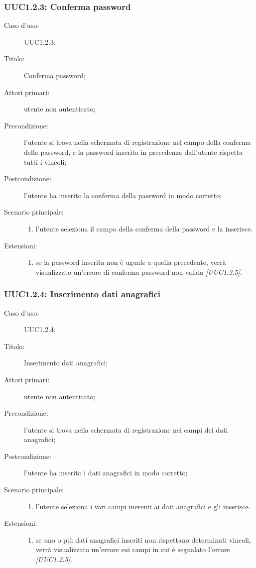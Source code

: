 \documentclass[components/casi-duso-app]{subfiles}
\begin{document}
\subsubsection{UUC1.2.3: Conferma password}%
\label{subs:UUC1.2.3}
\begin{description}
  \item[Caso d’uso:] UUC1.2.3;
  \item[Titolo:] Conferma password;
  \item[Attori primari:] utente non autenticato;
  \item[Precondizione:] l'utente si trova nella schermata di registrazione nel campo della conferma della password,
        e la password inserita in precedenza dall'utente rispetta tutti i vincoli;
  \item[Postcondizione:] l'utente ha inserito la conferma della password in modo corretto;
  \item[Scenario principale:]
  \begin{enumerate}
    \item l'utente seleziona il campo della conferma della password e la inserisce.
  \end{enumerate}
  \item[Estensioni:]
  \begin{enumerate}
    \item se la password inserita non è uguale a quella precedente, verrà visualizzato un'errore di conferma password non valida \emph{[UUC1.2.5]}.
  \end{enumerate}
\end{description}



\subsubsection{UUC1.2.4: Inserimento dati anagrafici}%
\label{subs:UUC1.2.4}
\begin{description}
  \item[Caso d’uso:] UUC1.2.4;
  \item[Titolo:] Inserimento dati anagrafici;
  \item[Attori primari:] utente non autenticato;
  \item[Precondizione:] l'utente si trova nella schermata di registrazione nei campi dei dati anagrafici;
  \item[Postcondizione:] l'utente ha inserito i dati anagrafici in modo corretto;
  \item[Scenario principale:]
  \begin{enumerate}
    \item l'utente seleziona i vari campi inerenti ai dati anagrafici e gli inserisce.
  \end{enumerate}
  \item[Estensioni:]
  \begin{enumerate}
    \item se uno o più dati anagrafici inseriti non rispettano determinati vincoli, verrà visualizzato un'errore sui campi in cui è segnalato l'errore \emph{[UUC1.2.5]}.
  \end{enumerate}
\end{description}
\end{document}
